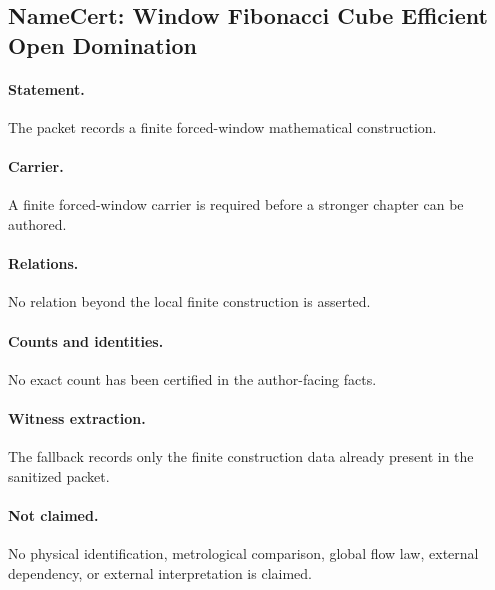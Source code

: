 \subsection{NameCert: Window Fibonacci Cube Efficient Open Domination}
\label{sec:namecert-window_fibonacci_cube_efficient_open_domination_certificate}

\paragraph{Statement.} The packet records a finite forced-window mathematical construction.

\paragraph{Carrier.} A finite forced-window carrier is required before a stronger chapter can be authored.

\paragraph{Relations.} No relation beyond the local finite construction is asserted.

\paragraph{Counts and identities.} No exact count has been certified in the author-facing facts.

\paragraph{Witness extraction.} The fallback records only the finite construction data already present in the sanitized packet.

\paragraph{Not claimed.} No physical identification, metrological comparison, global flow law, external dependency, or external interpretation is claimed.
